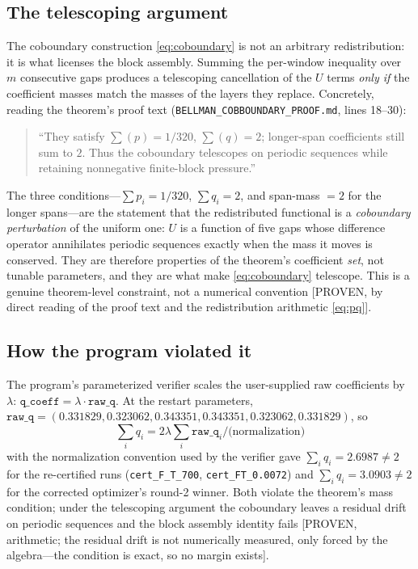 \documentclass[11pt]{article}
\begin{document}
\subsection{The telescoping argument}
The coboundary construction \eqref{eq:coboundary} is not an arbitrary
redistribution: it is what licenses the block assembly. Summing the per-window
inequality over $m$ consecutive gaps produces a telescoping cancellation of the
$U$ terms \emph{only if} the coefficient masses match the masses of the layers
they replace. Concretely, reading the theorem's proof text
(\texttt{BELLMAN\_COBBOUNDARY\_PROOF.md}, lines 18--30):
\begin{quote}
``They satisfy $\sum(p)=1/320$, $\sum(q)=2$; longer-span coefficients still sum
to $2$. Thus the coboundary telescopes on periodic sequences while retaining
nonnegative finite-block pressure.''
\end{quote}
The three conditions---$\sum p_i = 1/320$, $\sum q_i = 2$, and span-mass $= 2$
for the longer spans---are the statement that the redistributed functional is a
\emph{coboundary perturbation} of the uniform one: $U$ is a function of five
gaps whose difference operator annihilates periodic sequences exactly when the
mass it moves is conserved. They are therefore properties of the theorem's
coefficient \emph{set}, not tunable parameters, and they are what make
\eqref{eq:coboundary} telescope. This is a genuine theorem-level constraint, not
a numerical convention [PROVEN, by direct reading of the proof text and the
redistribution arithmetic \eqref{eq:pq}].

\subsection{How the program violated it}
The program's parameterized verifier scales the user-supplied raw coefficients
by $\lambda$: $\texttt{q\_coeff} = \lambda \cdot \texttt{raw\_q}$. At the
restart parameters, $\texttt{raw\_q} = (0.331829, 0.323062, 0.343351,
0.343351, 0.323062, 0.331829)$, so
\[
\sum_i q_i = 2 \lambda \sum_i \texttt{raw\_q}_i / \text{(normalization)}
\]
with the normalization convention used by the verifier gave
$\sum_i q_i = 2.6987 \neq 2$ for the re-certified runs
(\texttt{cert\_F\_T\_700}, \texttt{cert\_FT\_0.0072}) and $\sum_i q_i = 3.0903
\neq 2$ for the corrected optimizer's round-2 winner. Both violate the
theorem's mass condition; under the telescoping argument the coboundary leaves a
residual drift on periodic sequences and the block assembly identity fails
[PROVEN, arithmetic; the residual drift is not numerically measured, only forced
by the algebra---the condition is exact, so no margin exists].
\end{document}
